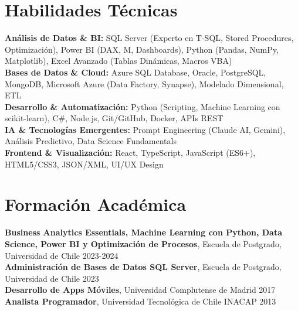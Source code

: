 \documentclass[11pt,letterpaper]{article}
\begin{document}
\section{Habilidades T\'{e}cnicas}
\textbf{Análisis de Datos \& BI:} SQL Server (Experto en T-SQL, Stored Procedures, Optimización), Power BI (DAX, M, Dashboards), Python (Pandas, NumPy, Matplotlib), Excel Avanzado (Tablas Dinámicas, Macros VBA) \\
\textbf{Bases de Datos \& Cloud:} Azure SQL Database, Oracle, PostgreSQL, MongoDB, Microsoft Azure (Data Factory, Synapse), Modelado Dimensional, ETL \\
\textbf{Desarrollo \& Automatización:} Python (Scripting, Machine Learning con scikit-learn), C\#, Node.js, Git/GitHub, Docker, APIs REST \\
\textbf{IA \& Tecnologías Emergentes:} Prompt Engineering (Claude AI, Gemini), Análisis Predictivo, Data Science Fundamentals \\
\textbf{Frontend \& Visualización:} React, TypeScript, JavaScript (ES6+), HTML5/CSS3, JSON/XML, UI/UX Design

\section{Formaci\'{o}n Acad\'{e}mica}
\textbf{Business Analytics Essentials, Machine Learning con Python, Data Science, Power BI y Optimización de Procesos}, Escuela de Postgrado, Universidad de Chile \hfill 2023-2024 \\
\textbf{Administración de Bases de Datos SQL Server}, Escuela de Postgrado, Universidad de Chile \hfill 2023 \\
\textbf{Desarrollo de Apps Móviles}, Universidad Complutense de Madrid \hfill 2017 \\
\textbf{Analista Programador}, Universidad Tecnológica de Chile INACAP \hfill 2013
\end{document}
